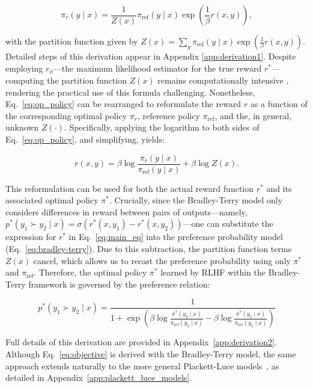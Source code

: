 \begin{equation}\label{eq:op_policy}
    \pi_r(y\mid x) = \frac{1}{Z(x)}\pi_\text{ref}(y\mid x)\exp\left(\frac{1}{\beta}r(x, y)\right),
\end{equation}

with the partition function given by $Z(x) =\sum_{y}\pi_\text{ref}(y\mid x)\exp\left(\frac{1}{\beta}r(x, y)\right)$. Detailed steps of this derivation appear in Appendix \ref{app:derivation1}. Despite employing $r_{\phi}$—the maximum likelihood estimator for the true reward $r^*$—computing the partition function $Z(x)$ remains computationally intensive \citep{korbak2022reinforcement, go2023aligning}, rendering the practical use of this formula challenging. Nonetheless, Eq.~\ref{eq:op_policy} can be rearranged to reformulate the reward $r$ as a function of the corresponding optimal policy $\pi_r$, reference policy $\pi_\text{ref}$, and the, in general, unknown $Z(\cdot)$. Specifically, applying the logarithm to both sides of Eq.~\ref{eq:op_policy}, and simplifying, yields:

\begin{equation}\label{eq:main_eq}
    r(x,y) =\beta \log \frac{\pi_r(y\mid x)}{\pi_\text{ref}(y\mid x)} + \beta \log Z(x).
\end{equation}

This reformulation can be used for both the actual reward function $r^*$ and its associated optimal policy $\pi^*$. Crucially, since the Bradley-Terry model only considers differences in reward between pairs of outputs—namely, ${p^*(y_1 \succ y_2 \mid x) = \sigma(r^*(x, y_1) - r^*(x, y_2))}$—one can substitute the expression for $r^*$ in Eq.~\ref{eq:main_eq} into the preference probability model (Eq.~\ref{eq:bradley-terry}). Due to this subtraction, the partition function terms $Z(x)$ cancel, which allows us to recast the preference probability using only $\pi^*$ and $\pi_\text{ref}$. Therefore, the optimal policy $\pi^*$ learned by RLHF within the Bradley-Terry framework is governed by the preference relation:

\begin{equation}\label{eq:objective}
    p^*(y_1\succ y_2 \mid x)=\frac{1}{1 + \exp\left(\beta \log \frac{\pi^*(y_2\mid x)}{\pi_\text{ref}(y_2\mid x)} - \beta \log \frac{\pi^*(y_1\mid x)}{\pi_\text{ref}(y_1\mid x)}\right)}
\end{equation}

Full details of this derivation are provided in Appendix~\ref{app:derivation2}. Although Eq.~\ref{eq:objective} is derived with the Bradley-Terry model, the same approach extends naturally to the more general Plackett-Luce models~\citep{plackett1975analysis, luce2012individual}, as detailed in Appendix~\ref{app:plackett_luce_models}.

